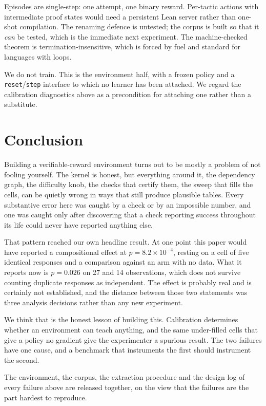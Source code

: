 \documentclass[10pt]{article}
\begin{document}
Episodes are single-step: one attempt, one binary reward. Per-tactic actions
with intermediate proof states would need a persistent Lean server rather than
one-shot compilation. The renaming defence is untested; the corpus is built so
that it \emph{can} be tested, which is the immediate next experiment. The
machine-checked theorem is termination-insensitive, which is forced by fuel and
standard for languages with loops.

We do not train. This is the environment half, with a frozen policy and a
\texttt{reset}/\texttt{step} interface to which no learner has been attached. We
regard the calibration diagnostics above as a precondition for attaching one
rather than a substitute.

\section{Conclusion}

Building a verifiable-reward environment turns out to be mostly a problem of not
fooling yourself. The kernel is honest, but everything around it, the dependency
graph, the difficulty knob, the checks that certify them, the sweep that fills
the cells, can be quietly wrong in ways that still produce plausible tables.
Every substantive error here was caught by a check or by an impossible number,
and one was caught only after discovering that a check reporting success
throughout its life could never have reported anything else.

That pattern reached our own headline result. At one point this paper would have
reported a compositional effect at $p=8.2\times10^{-4}$, resting on a cell of
five identical responses and a comparison against an arm with no data. What it
reports now is $p=0.026$ on 27 and 14 observations, which does not survive
counting duplicate responses as independent. The effect is probably real and is
certainly not established, and the distance between those two statements was
three analysis decisions rather than any new experiment.

We think that is the honest lesson of building this. Calibration determines
whether an environment can teach anything, and the same under-filled cells that
give a policy no gradient give the experimenter a spurious result. The two
failures have one cause, and a benchmark that instruments the first should
instrument the second.

The environment, the corpus, the extraction procedure and the design log of
every failure above are released together, on the view that the failures are the
part hardest to reproduce.
\end{document}

